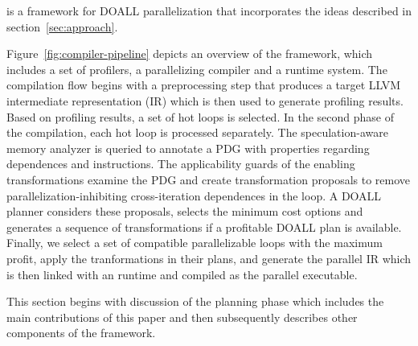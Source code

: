 %
\name is a framework for DOALL parallelization that incorporates the
ideas described in section~\ref{sec:approach}.


Figure~\ref{fig:compiler-pipeline} depicts an overview of the \name
framework, which includes a set of profilers, a parallelizing compiler
and a runtime system.
%
The compilation flow begins with a preprocessing step that produces a
target LLVM intermediate representation (IR) which is then used to
generate profiling results.  Based on profiling results, a set of hot
loops is selected.  In the second phase of the compilation, each hot
loop is processed separately.  The speculation-aware memory analyzer
is queried to annotate a PDG with properties regarding dependences and
instructions.  The applicability guards of the enabling
transformations examine the PDG and create transformation proposals to
remove parallelization-inhibiting cross-iteration dependences in the
loop. A DOALL planner considers these proposals, selects the minimum
cost options and generates a sequence of transformations if a
profitable DOALL plan is available.  Finally, we select a set of
compatible parallelizable loops with the maximum profit, apply the
tranformations in their plans, and generate the parallel IR which is
then linked with an runtime and compiled as the parallel executable.

This section begins with discussion of the planning phase which
includes the main contributions of this paper and then subsequently
describes other components of the framework.

